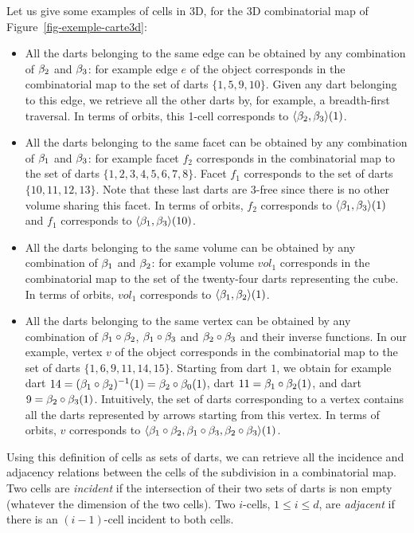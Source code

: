 Let us give some examples of cells in 3D, for the 3D combinatorial map
of Figure~\ref{fig-exemple-carte3d}:
\begin{itemize}
\item All the darts belonging to the same edge can be obtained by any
  combination of $\beta_{2}$ and $\beta_{3}$: for example edge $e$ of the
  object corresponds in the combinatorial map to the set of darts
  $\{1,5,9,10\}$. Given any dart belonging to this edge, we retrieve
  all the other darts by, for example, a breadth-first traversal. In terms
  of orbits, this 1-cell corresponds to $\langle{}\beta_2,\beta_3\rangle{}(1)$.

\item All the darts belonging to the same facet can be obtained by any
  combination of $\beta_{1}$ and $\beta_{3}$: for example facet $f_2$
  corresponds in the combinatorial map to the set of darts
  $\{1,2,3,4,5,6,7,8\}$. Facet $f_1$ corresponds to the set of darts
  $\{10,11,12,13\}$. Note that these last darts are $3$-free since
  there is no other volume sharing this facet.  In terms of orbits,
  $f_2$ corresponds to $\langle{}\beta_1,\beta_3\rangle{}(1)$ and $f_1$
  corresponds to $\langle{}\beta_1,\beta_3\rangle{}(10)$.

\item All the darts belonging to the same volume can be obtained by
  any combination of $\beta_{1}$ and $\beta_{2}$: for example volume $vol_1$
  corresponds in the combinatorial map to the set of the twenty-four
  darts representing the cube. In terms of orbits, $vol_1$ corresponds
  to $\langle{}\beta_1,\beta_2\rangle{}(1)$.

\item All the darts belonging to the same vertex can be obtained by
  any combination of $\beta_{1}\circ\beta_{2}$,
  $\beta_{1}\circ\beta_{3}$ and $\beta_{2}\circ\beta_{3}$ and their inverse
  functions.  In our example, vertex $v$ of the object corresponds
  in the combinatorial map to the set of darts $\{1,6,9,11,14,15\}$.
  Starting from dart $1$, we obtain for example dart
  $14=(\beta_{1}\circ\beta_{2})^{-1}(1)=\beta_{2}\circ\beta_{0}(1)$, dart
  $11=\beta_{1}\circ\beta_{2}(1)$, and dart $9=\beta_{2}\circ\beta_{3}(1)$.
  Intuitively, the set of darts corresponding to a vertex contains all
  the darts represented by arrows starting from this vertex.  In terms
  of orbits, $v$ corresponds to $\langle{}\beta_1 \circ \beta_2,
    \beta_1 \circ \beta_3, \beta_2 \circ \beta_3\rangle{}(1)$.
\end{itemize}

Using this definition of cells as sets of darts, we can retrieve all the
incidence and adjacency relations between the cells of the subdivision
in a combinatorial map.  Two cells are \emph{incident} if the
intersection of their two sets of darts is non empty (whatever the
dimension of the two cells). Two $i$-cells, $1\leq i \leq d$, are
\emph{adjacent} if there is an $(i-1)$-cell incident to both cells.

